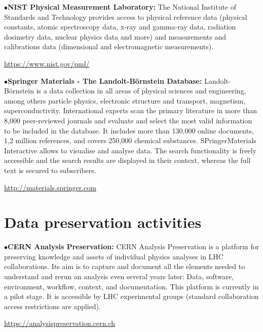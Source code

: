 \medskip
{}

\medskip

\item{$\bullet$}{\bf NIST Physical Measurement Laboratory:}
The National Institute of Standards and Technology provides access to physical reference data (physical constants, atomic spectroscopy data, x-ray and gamma-ray data, radiation dosimetry data, nuclear physics data and more) and measurements and calibrations data (dimensional and electromagnetic measurements).
	\item{}\qquad\url{https://www.nist.gov/pml/}

\medskip

\item{$\bullet$}{\bf Springer Materials  - The Landolt-B\"ornstein Database:}
Landolt-B\"ornstein is a data collection in all areas of physical sciences and engineering, among others particle physics, electronic structure and transport, magnetism, superconductivity. International experts scan the primary literature in more than 8,000 peer-reviewed journals and evaluate and select the most valid information to be included in the database. It includes more than 130,000 online documents, 1,2 million references, and covers 250,000 chemical substances. SPringerMaterials Interactive allows to visualise and analyse data.
The search functionality is freely accessible and the search results are displayed in their context, whereas the full text is secured to subscribers.
	\item{}\qquad\url{http://materials.springer.com}


\section{Data preservation activities}  %

\medskip


\item{$\bullet$}{\bf CERN Analysis Preservation:}
CERN Analysis Preservation is a platform for preserving knowledge and assets of individual physics analyses in LHC collaborations. Its aim is to capture and document all the elements needed to understand and rerun an analysis even several years later: Data, software, environment, workflow, context, and documentation. This platform is currently in a pilot stage. It is accessible by LHC experimental groups (standard collaboration access restrictions are applied).
	\item{}\qquad\url{https://analysispreservation.cern.ch}

